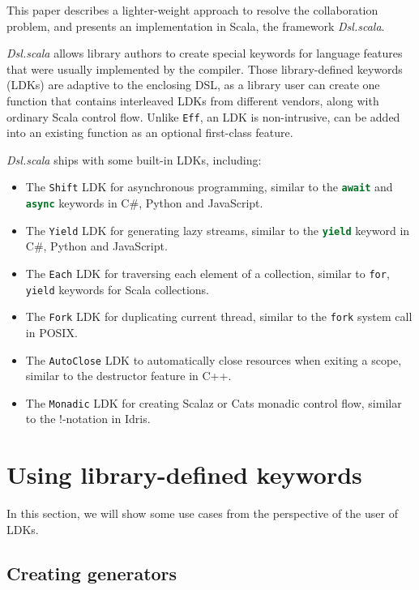 This paper describes a lighter-weight approach to resolve the collaboration problem, and presents an implementation in Scala, the framework \textit{Dsl.scala}.

\textit{Dsl.scala} allows library authors to create special keywords for language features that were usually implemented by the compiler. Those library-defined keywords (LDKs) are adaptive to the enclosing DSL, as a library user can create one function that contains interleaved LDKs from different vendors, along with ordinary Scala control flow. Unlike \lstinline{Eff}, an LDK is non-intrusive, can be added into an existing function as an optional first-class feature.

\textit{Dsl.scala} ships with some built-in LDKs, including:
\begin{itemize}
  \item The \lstinline{Shift} LDK for asynchronous programming, similar to the \lstinline[language=Python]{await} and \lstinline[language=Python]{async} keywords in C\#, Python and JavaScript.
  \item The \lstinline{Yield} LDK for generating lazy streams, similar to the \lstinline[language=Python]{yield} keyword in C\#, Python and JavaScript.
  \item The \lstinline{Each} LDK for traversing each element of a collection, similar to \lstinline{for}, \lstinline{yield} keywords for Scala collections.
  \item The \lstinline{Fork} LDK for duplicating current thread, similar to the \lstinline{fork} system call in POSIX.
  \item The \lstinline{AutoClose} LDK to automatically close resources when exiting a scope, similar to the destructor feature in C++.
  \item The \lstinline{Monadic} LDK for creating Scalaz \cite{kenji2017scalaz} or Cats \cite{typelevel2017cats} monadic control flow, similar to the !-notation in Idris\cite{brady2013idris}.
\end{itemize}

\section{Using library-defined keywords}\label{Using library-defined keywords}

In this section, we will show some use cases from the perspective of the user of LDKs.

\subsection{Creating generators}\label{Creating generators}


